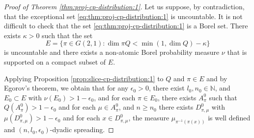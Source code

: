 \documentclass[10pt,a4paper]{amsart}
\def\D{\mathcal{D}}
\def\N{\mathbb N}
\begin{document}
\begin{proof}[Proof of Theorem \ref{thm:proj-cp-distribution:1}]
Let us suppose,  by contradiction, that the exceptional set \eqref{eq:thm:proj-cp-distribution:1}  is uncountable.  It is not difficult to check that the set \eqref{eq:thm:proj-cp-distribution:1} is a Borel set.  There exists $\kappa>0$ such that the set 
\[
E=\{ \pi\in G(2,1): \dim \pi Q<\min(1,\dim Q)-\kappa \}
\]
is uncountable and there exists a non-atomic Borel probability measure $\nu$ that is supported on a compact subset of $E$.

Applying Proposition \ref{prop:slice-cp-distribution:1} to $Q$ and $\pi\in E$ and by Egorov's theorem,  we obtain that for any $\epsilon_0>0$, there exist $l_0,  n_0\in \N$,  and $E_0\subset E$ with $\nu(E_0)>1-\epsilon_0$, and for each $\pi\in E_0$, there exists $A_\pi^0$ such that $Q(A_\pi^0)>1-\epsilon_0$ and for each $\mu\in A_\pi^0$, and $n\ge n_0$  there exists $D_{\pi,\mu}^0$ with $\mu(D_{\pi,\mu}^0)>1-\epsilon_0$ and for each $x\in D_{\pi,\mu}^0$, the measure $\mu_{\pi^{-1}(\pi(x))}$ is well defined  and $(n,l_0,\epsilon_0)$-dyadic spreading.

\end{proof}
\end{document}
